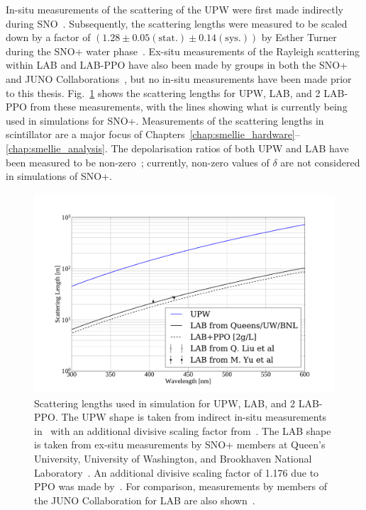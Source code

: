 In-situ measurements of the scattering of the UPW were first made indirectly during SNO~\cite{moffatOpticalCalibrationSudbury2001}. Subsequently, the scattering lengths were measured to be scaled down by a factor of $(1.28\pm0.05(\mathrm{stat.})\pm0.14(\mathrm{sys.}))$ by Esther Turner during the SNO+ water phase~\cite{turnerMeasurementScatteringCharacteristics2022}. Ex-situ measurements of the Rayleigh scattering within LAB and LAB-PPO have also been made by groups in both the SNO+ and JUNO Collaborations~\cite{chenOpticalPropertiesRAT2012,seguiScintillatorModelComparison2015,liuAttenuationScatteringTeBD2016,liuRayleighScatteringDepolarization2015,yuMeasurementsRayleighRatios2022}, %
but no in-situ measurements have been made prior to this thesis. Fig.~\ref{fig:scattering_lengths_upw_labppo_current} shows the scattering lengths for UPW, LAB, and \SI{2}{\gpl} LAB-PPO from these measurements, with the lines showing what is currently being used in simulations for SNO+. Measurements of the scattering lengths in scintillator are a major focus of Chapters~\ref{chap:smellie_hardware}--\ref{chap:smellie_analysis}. The depolarisation ratios of both UPW and LAB have been measured to be non-zero~\cite{JerlovNilsGunnar1974Oaoo,liuRayleighScatteringDepolarization2015}; currently, non-zero values of $\delta$ are not considered in simulations of SNO+.

\begin{figure}[!ht]
    \centering
    \includegraphics[width=0.8\linewidth]{2_Detector/Figs/scattering_lengths_plot.pdf}
    \caption[Scattering lengths in simulation for UPW, LAB, and \SI{2.2}{\gpl} LAB-PPO]
    {Scattering lengths used in simulation for UPW, LAB, and \SI{2}{\gpl} LAB-PPO. The UPW shape is taken from indirect in-situ measurements in~\cite{moffatOpticalCalibrationSudbury2001} with an additional divisive scaling factor from~\cite{turnerMeasurementScatteringCharacteristics2022}. The LAB shape is taken from ex-situ measurements by SNO+ members at Queen's University, University of Washington, and Brookhaven National Laboratory~\cite{chenOpticalPropertiesRAT2012,seguiScintillatorModelComparison2015}. An additional divisive scaling factor of 1.176 due to PPO was made by~\cite{liuAttenuationScatteringTeBD2016}. For comparison, measurements by members of the JUNO Collaboration for LAB are also shown~\cite{liuRayleighScatteringDepolarization2015,yuMeasurementsRayleighRatios2022}.}
    \label{fig:scattering_lengths_upw_labppo_current}
\end{figure}

